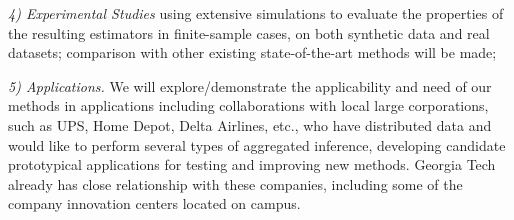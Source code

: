 \documentclass[12pt]{article}
\newenvironment{packed_item}{
\begin{itemize}
  \setlength{\itemindent}{-0em}
  \setlength{\itemsep}{-0em}
  \setlength{\parskip}{-0em}
  \setlength{\parsep}{-0em}
}{\end{itemize}}
\begin{document}
{\em 4) Experimental Studies}  using extensive simulations to evaluate the properties of
the resulting estimators in finite-sample cases, on both synthetic data and real datasets;
comparison with other existing state-of-the-art methods will be made;

{\em 5) Applications.} We will explore/demonstrate the applicability and need of our methods in applications including
collaborations with local large corporations, such as UPS, Home Depot, Delta Airlines, etc., who have distributed data and would like to perform several types of aggregated inference, developing candidate prototypical applications for testing and improving new methods. Georgia Tech already has close relationship with these companies, including
some of the company innovation centers located on campus.



%
%
%
%
\end{document}
